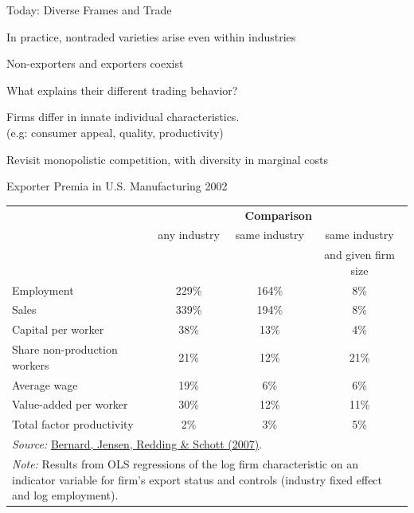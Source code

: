 \documentclass[notes,11pt, aspectratio=169, xcolor=table]{beamer}
\newenvironment{wideitemize}{\itemize\addtolength{\itemsep}{10pt}}{\enditemize}
\begin{document}
\begin{frame}{Today: Diverse Frames and Trade}

\begin{wideitemize}
    \item In practice, nontraded varieties arise even within industries
    \item Non-exporters and exporters coexist
    \item  What explains their different trading behavior?
    \item  Firms differ in innate individual characteristics. \\
 \qquad (e.g: consumer appeal, quality, productivity)
    \item  Revisit monopolistic competition, with diversity in marginal costs
\end{wideitemize}
    
\end{frame}

\begin{frame}{Exporter Premia in U.S. Manufacturing 2002}
\begin{table}[htbp]
\centering
\label{tab:exporter-premia}
\begin{tabular}{lccc}
\toprule
& \multicolumn{3}{c}{\textbf{Comparison}} \\
\cmidrule(lr){2-4}
& any industry & same industry & same industry \\
&              &               & and given firm size \\
\midrule
Employment                 & 229\% & 164\% & 8\% \\
Sales                      & 339\% & 194\% & 8\% \\
Capital per worker         & 38\%  & 13\%  & 4\% \\
Share non-production workers & 21\%  & 12\%  & 21\% \\
Average wage               & 19\%  & 6\%   & 6\% \\
Value-added per worker     & 30\%  & 12\%  & 11\% \\
Total factor productivity  & 2\%   & 3\%   & 5\% \\
\bottomrule
\multicolumn{4}{p{0.85\linewidth}}{\footnotesize \textit{Source:} \href{https://www.aeaweb.org/articles?id=10.1257/jep.21.3.105}{Bernard, Jensen, Redding \& Schott (2007)}.}\\
\multicolumn{4}{p{0.85\linewidth}}{\footnotesize \textit{Note:} Results from OLS regressions of the log firm characteristic on an indicator variable for firm’s export status and controls (industry fixed effect and log employment).}
\end{tabular}
\end{table}
    
\end{frame}
\end{document}
